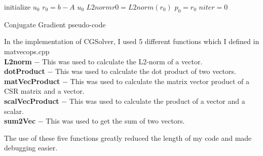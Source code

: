\documentclass{article}
\begin{document}
\setlength{\parindent}{0pt}
\setlength{\parskip}{1ex}

\begin{algorithm}[H]
 \SetAlgoLined
 initialize $u_0$\;
 $r_0 = b - A$ $u_0$\;
 $L2normr0 = L2norm(r_0)$\;
 $p_0 = r_0$\;
 $niter = 0$\;
 \caption{Conjugate Gradient pseudo-code}
\end{algorithm}

In the implementation of CGSolver, I used 5 different functions which I defined
in matvecops.cpp\\
\textbf{L2norm} $-$ This was used to calculate the L2-norm of a vector.\\
\textbf{dotProduct} $-$ This was used to calculate the dot product of two vectors.\\
\textbf{matVecProduct} $-$ This was used to calculate the matrix vector product of a
CSR matrix and a vector.\\
\textbf{scalVecProduct} $-$ This was used to calculate the product of a vector and a
scalar.\\
\textbf{sum2Vec} $-$ This was used to get the sum of two vectors.

The use of these five functions greatly reduced the length of my code and made
debugging easier.
\end{document}
